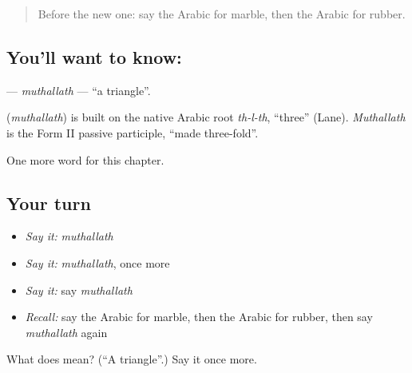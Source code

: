 \label{lesson:AR-C250-muthallath}



\begin{quote}
Before the new one: say the Arabic for marble, then the Arabic for rubber.
\end{quote}

\subsection*{You'll want to know: }
\textbf{} — \emph{muthallath} — \textquotedblleft{}a triangle\textquotedblright{}.

\begin{cousinweb}
\textbf{} (\emph{muthallath}) is built on the native Arabic root \emph{th-l-th}, \textquotedblleft{}three\textquotedblright{} (Lane). \emph{Muthallath} is the Form II passive participle, \textquotedblleft{}made three-fold\textquotedblright{}.
\end{cousinweb}

\begin{grammarlens}[title={What you've built}]
One more word for this chapter.
\end{grammarlens}

\subsection*{Your turn}
\begin{itemize}
\raggedright
  \item \emph{Say it:} \emph{muthallath}
  \item \emph{Say it:} \emph{muthallath}, once more
  \item \emph{Say it:} say \emph{muthallath}
  \item \emph{Recall:} say the Arabic for marble, then the Arabic for rubber, then say \emph{muthallath} again
\end{itemize}

\begin{tcolorbox}[breakable,colback=teal!4,colframe=teal!35!black,title={Before you move on}]
What does  mean? (\textquotedblleft{}A triangle\textquotedblright{}.) Say it once more.
\end{tcolorbox}
